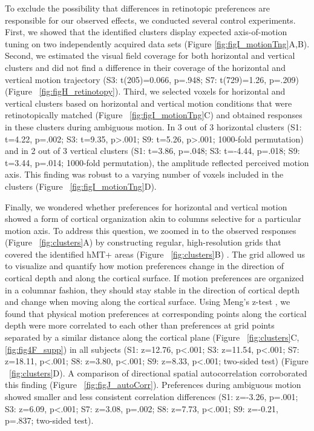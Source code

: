 To exclude the possibility that differences in retinotopic preferences are responsible for our observed effects, we conducted several control experiments. First, we showed that the identified clusters display expected axis-of-motion tuning on two independently acquired data sets (Figure  \ref{fig:figI_motionTng}A,B). Second, we estimated the visual field coverage for both horizontal and vertical clusters and did not find a difference in their coverage of the horizontal and vertical motion trajectory (S3: t(205)=0.066, p=.948; S7: t(729)=1.26, p=.209) (Figure ~\ref{fig:figH_retinotopy}). Third, we selected voxels for horizontal and vertical clusters based on horizontal and vertical motion conditions that were retinotopically matched (Figure ~\ref{fig:figI_motionTng}C) and obtained responses in these clusters during ambiguous motion. In 3 out of 3 horizontal clusters (S1: t=4.22, p=.002; S3: t=9.35, p\textgreater.001; S9: t=5.26, p\textgreater.001; 1000-fold permutation) and in 2 out of 3 vertical clusters (S1: t=3.86, p=.048; S3: t=-4.44, p=.018; S9: t=3.44, p=.014; 1000-fold permutation), the amplitude reflected perceived motion axis. This finding was robust to a varying number of voxels included in the clusters (Figure ~\ref{fig:figI_motionTng}D).

Finally, we wondered whether preferences for horizontal and vertical motion showed a form of cortical organization akin to columns selective for a particular motion axis. To address this question, we zoomed in to the observed responses (Figure ~\ref{fig:clusters}A) by constructing regular, high-resolution grids that covered the identified hMT+ areas (Figure ~\ref{fig:clusters}B) \parencite{Zimmermann2011,Kemper2017}. The grid allowed us to visualize and quantify how motion preferences change in the direction of cortical depth and along the cortical surface. If motion preferences are organized in a columnar fashion, they should stay stable in the direction of cortical depth and change when moving along the cortical surface. Using Meng's z-test \parencite{Meng1992}, we found that physical motion preferences at corresponding points along the cortical depth were more correlated to each other than preferences at grid points separated by a similar distance along the cortical plane (Figure ~\ref{fig:clusters}C, \ref{fig:fig4F_supp}) \parencite{Nasr2016} in all subjects (S1: z=12.76, p\textless.001; S3: z=11.54, p\textless.001; S7: z=18.11, p\textless.001; S8: z=3.80, p\textless.001; S9: z=8.33, p\textless.001; two-sided test) (Figure ~\ref{fig:clusters}D). A comparison of directional spatial autocorrelation corroborated this finding (Figure ~\ref{fig:figJ_autoCorr}). Preferences during ambiguous motion showed smaller and less consistent correlation differences (S1: z=-3.26, p=.001; S3: z=6.09, p\textless.001; S7: z=3.08, p=.002; S8: z=7.73, p\textless.001; S9: z=-0.21, p=.837; two-sided test).

